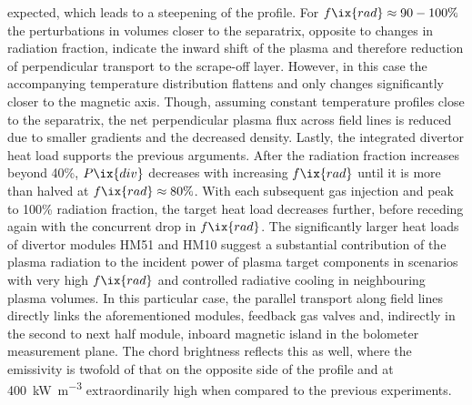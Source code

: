 expected, which leads to a steepening of the profile. For $f\ix{rad}\approx90-100\%$ the perturbations in volumes closer to the separatrix, opposite to changes in radiation fraction, indicate the inward shift of the plasma and therefore reduction of perpendicular transport to the scrape-off layer. However, in this case the accompanying temperature distribution flattens and only changes significantly closer to the magnetic axis. Though, assuming constant temperature profiles close to the separatrix, the net perpendicular plasma flux across field lines is reduced due to smaller gradients and the decreased density. Lastly, the integrated divertor heat load supports the previous arguments. After the radiation fraction increases beyond 40\%, $P\ix{div}$ decreases with increasing $f\ix{rad}$ until it is more than halved at $f\ix{rad}\approx80\%$. With each subsequent gas injection and peak to 100\% radiation fraction, the target heat load decreases further, before receding again with the concurrent drop in $f\ix{rad}$. The significantly larger heat loads of divertor modules HM51 and HM10 suggest a substantial contribution of the plasma radiation to the incident power of plasma target components in scenarios with very high $f\ix{rad}$ and controlled radiative cooling in neighbouring plasma volumes. In this particular case, the parallel transport along field lines directly links the aforementioned modules, feedback gas valves and, indirectly in the second to next half module, inboard magnetic island in the bolometer measurement plane. The chord brightness reflects this as well, where the emissivity is twofold of that on the opposite side of the profile and at \SI{400}{\kilo\watt\per\cubic\meter} extraordinarily high when compared to the previous experiments.\\%
